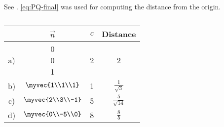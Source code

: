   See 
  .
			\eqref{eq:PQ-final} was used for computing the distance from the origin.
			\begin{table}[H]
  \centering
  \begin{tabular}{|c|c|c|c|}
    \hline
    & $\vec{n}$ & $c$ & Distance \\
    \hline
    a) &		\myvec{0\\0\\1}  &2  & 2 \\
    \hline
    b) & $\myvec{1\\1\\1}$ & 1 & $\frac{1}{\sqrt{3}}$ \\
    \hline
    c) & $\myvec{2\\3\\-1}$ & 5 & $\frac{5}{\sqrt{14}}$ \\
    \hline
    d) & $\myvec{0\\-5\\0}$ & 8 & $\frac{8}{5}$ \\
    \hline
  \end{tabular}
  \caption{}
  \label{tab:12/11/3/1}
\end{table}
 


